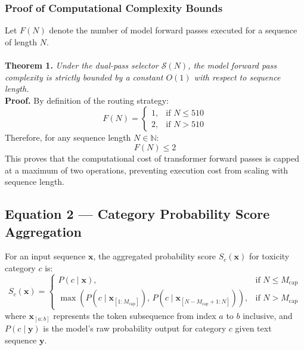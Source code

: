 \documentclass[10pt]{article}
\begin{document}
\subsubsection{Proof of Computational Complexity Bounds}
Let $F(N)$ denote the number of model forward passes executed for a sequence of length $N$.
\\
\\
\textbf{Theorem 1.} \textit{Under the dual-pass selector $\mathcal{S}(N)$, the model forward pass complexity is strictly bounded by a constant $O(1)$ with respect to sequence length.}
\\
\textbf{Proof.}
By definition of the routing strategy:
\begin{equation}
F(N) = \begin{cases} 1, & \text{if } N \le 510 \\ 2, & \text{if } N > 510 \end{cases}
\end{equation}
Therefore, for any sequence length $N \in \mathbb{N}$:
\begin{equation}
F(N) \le 2
\end{equation}
This proves that the computational cost of transformer forward passes is capped at a maximum of two operations, preventing execution cost from scaling with sequence length.

\subsection{Equation 2 --- Category Probability Score Aggregation}
For an input sequence $\mathbf{x}$, the aggregated probability score $S_c(\mathbf{x})$ for toxicity category $c$ is:
\begin{equation}
S_c(\mathbf{x}) = \begin{cases} P(c \mid \mathbf{x}), & \text{if } N \le M_{\text{cap}} \\ \max\left( P(c \mid \mathbf{x}_{[1:M_{\text{cap}}]}), \, P(c \mid \mathbf{x}_{[N-M_{\text{cap}}+1:N]}) \right), & \text{if } N > M_{\text{cap}} \end{cases}
\end{equation}
where $\mathbf{x}_{[a:b]}$ represents the token subsequence from index $a$ to $b$ inclusive, and $P(c \mid \mathbf{y})$ is the model's raw probability output for category $c$ given text sequence $\mathbf{y}$.
\end{document}
